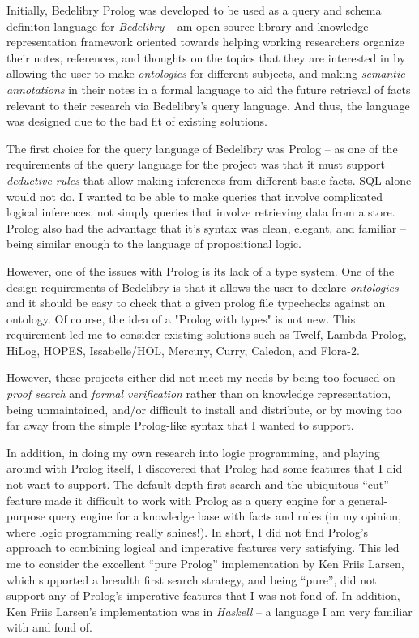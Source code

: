 \documentclass{book}
\begin{document}
Initially, Bedelibry Prolog was developed to be used as a query and schema definiton language for \textit{Bedelibry} -- am open-source library and knowledge representation framework oriented towards helping working researchers organize their notes, references, and thoughts on the topics that they are interested in by allowing the user to make \textit{ontologies} for different subjects, and making \textit{semantic annotations} in their notes in a formal language to aid the future retrieval of facts relevant to their research via Bedelibry's query language. And thus, the language was designed due to the bad fit of existing solutions.

The first choice for the query language of Bedelibry was Prolog -- as one of the requirements of the query language for the project was that it must support \textit{deductive rules} that allow making inferences from different basic facts. SQL alone would not do. I wanted to be able to make queries that involve complicated logical inferences, not simply queries that involve retrieving data from a store. Prolog also had the advantage that it's syntax was clean, elegant, and familiar -- being similar enough to the language of propositional logic.

However, one of the issues with Prolog is its lack of a type system. One of the design requirements of Bedelibry is that it allows the user to declare \textit{ontologies} -- and it should be easy to check that a given prolog file typechecks against an ontology. Of course, the idea of a "Prolog with types" is not new. This requirement led me to consider existing solutions such as Twelf, Lambda Prolog, HiLog, HOPES, Issabelle/HOL, Mercury, Curry, Caledon, and Flora-2. 

However, these projects either did not meet my needs by being too focused on \textit{proof search} and \textit{formal verification} rather than on knowledge representation, being unmaintained, and/or difficult to install and distribute, or by moving too far away from the simple Prolog-like syntax that I wanted to support.

In addition, in doing my own research into logic programming, and playing around with Prolog itself, I discovered that Prolog had some features that I did not want to support. The default depth first search and the ubiquitous ``cut'' feature made it difficult to work with Prolog as a query engine for a general-purpose query engine for a knowledge base with facts and rules (in my opinion, where logic programming really shines!). In short, I did not find Prolog's approach to combining logical and imperative features very satisfying. This led me to consider the excellent ``pure Prolog'' implementation by Ken Friis Larsen, which supported a breadth first search strategy, and being ``pure'', did not support any of Prolog's imperative features that I was not fond of. In addition, Ken Friis Larsen's implementation was in \textit{Haskell} -- a language I am very familiar with and fond of.
\end{document}
